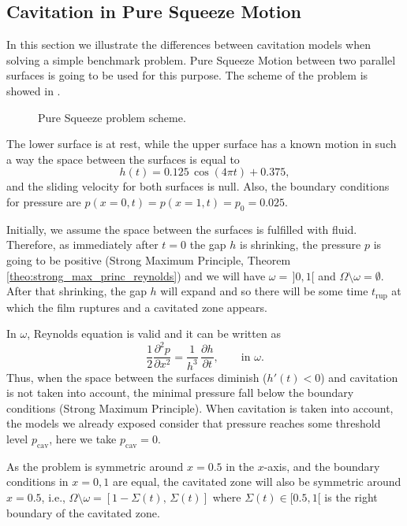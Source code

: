 \subsection{Cavitation in Pure Squeeze Motion}\label{sec:cavitation_pure_squeeze}
In this section we illustrate the differences between cavitation models when solving a simple benchmark problem. Pure Squeeze Motion between two parallel surfaces is going to be used for this purpose. The scheme of the problem is showed in .
\begin{figure}[ht!]
\centering 
\def\svgwidth{\textwidth}	
\footnotesize{
\caption{Pure Squeeze problem scheme.}\label{fig:squeeze_scheme}}
\end{figure}

The lower surface is at rest, while the upper surface has a known motion in such a way the space between the surfaces is equal to $$h(t)=0.125\,\cos(4\pi t)+0.375,$$ and the sliding velocity for both surfaces is null. Also, the boundary conditions for pressure are $p(x=0,t)=p(x=1,t)=p_0=0.025.$

Initially, we assume the space between the surfaces is fulfilled with fluid. Therefore, as immediately after $t=0$ the gap $h$ is shrinking, the pressure $p$ is going to be positive (Strong Maximum Principle, Theorem \ref{theo:strong_max_princ_reynolds}) and we will have $\omega=\,]0,1[$ and $\Omega\setminus\omega=\emptyset$. After that shrinking, the gap $h$ will expand and so there will be some time $t_\text{rup}$ at which the film ruptures and a cavitated zone appears.

In $\omega$, Reynolds equation is valid and it can be written as 
\begin{equation}
\frac{1}{2}\frac{\partial^2 p}{\partial x^2}=\frac{1}{h^3}\,\frac{\partial h}{\partial t },\qquad \text{in }\omega.\label{eq:reynolds_squeeze}
\end{equation}
Thus, when the space between the surfaces diminish ($h'(t)<0$) and cavitation is not taken into account, the minimal pressure fall below the boundary conditions (Strong Maximum Principle). When cavitation is taken into account, the models we already exposed consider that pressure reaches some threshold level $p_\text{cav}$, here we take $p_\text{cav}=0$.

As the problem is symmetric around $x=0.5$ in the $x$-axis, and the boundary conditions in $x=0,1$ are equal, the cavitated zone will also be symmetric around $x=0.5$, i.e., $\Omega\setminus\omega=[1-\Sigma(t),\,\Sigma(t)]$ where $\Sigma(t)\in [0.5,1[$ is the right boundary of the cavitated zone.
